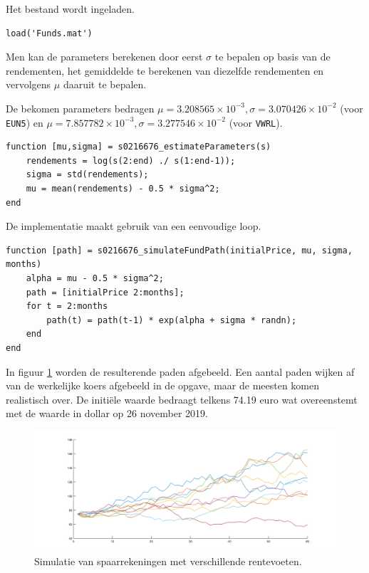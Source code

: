 

Het bestand wordt ingeladen.

\begin{lstlisting}
load('Funds.mat')
\end{lstlisting}



Men kan de parameters berekenen door eerst $\sigma$ te bepalen op basis van de rendementen, het gemiddelde te berekenen van diezelfde rendementen en vervolgens $\mu$ daaruit te bepalen.\\
\par\noindent De bekomen parameters bedragen $\mu = 3.208565\times 10^{-3}, \sigma = 3.070426\times 10^{-2}$ (voor \texttt{EUN5}) en $\mu = 7.857782\times 10^{-3}, \sigma = 3.277546\times 10^{-2}$ (voor \texttt{VWRL}).

\begin{lstlisting}
function [mu,sigma] = s0216676_estimateParameters(s)
    rendements = log(s(2:end) ./ s(1:end-1));
    sigma = std(rendements);
    mu = mean(rendements) - 0.5 * sigma^2;
end
\end{lstlisting}



De implementatie maakt gebruik van een eenvoudige  loop.

\begin{lstlisting}
function [path] = s0216676_simulateFundPath(initialPrice, mu, sigma, months)
    alpha = mu - 0.5 * sigma^2;
    path = [initialPrice 2:months];
    for t = 2:months
        path(t) = path(t-1) * exp(alpha + sigma * randn);
    end
end
\end{lstlisting}



In figuur \ref{fig:op6} worden de resulterende paden afgebeeld. Een aantal paden wijken af van de werkelijke koers afgebeeld in de opgave, maar de meesten komen realistisch over. De initi\"ele waarde bedraagt telkens 74.19 euro wat overeenstemt met de waarde in dollar op 26 november 2019.

\begin{figure}[h]
\centering
\includegraphics[width=\textwidth]{res/op6.png}
\caption{Simulatie van spaarrekeningen met verschillende rentevoeten.}
\label{fig:op6}
\end{figure}

